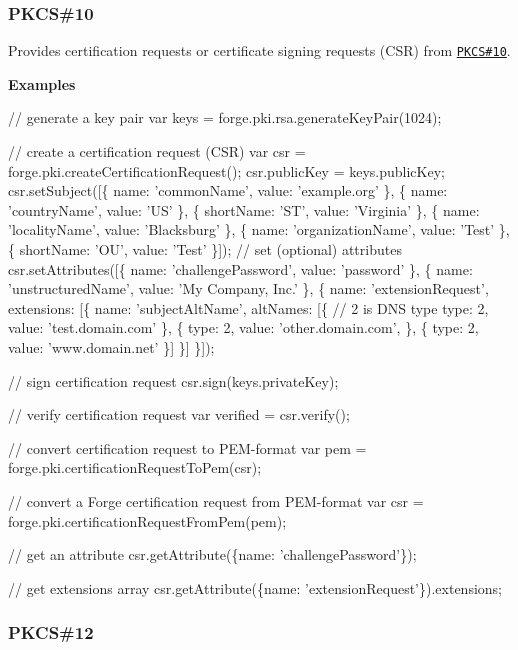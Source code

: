 \label{_pkcs10}%
 \subsubsection*{P\+K\+CS\#10}

Provides certification requests or certificate signing requests (C\+SR) from \href{http://en.wikipedia.org/wiki/Certificate_signing_request}{\tt P\+K\+CS\#10}.

{\bfseries Examples}


\begin{DoxyCode}
// generate a key pair
var keys = forge.pki.rsa.generateKeyPair(1024);

// create a certification request (CSR)
var csr = forge.pki.createCertificationRequest();
csr.publicKey = keys.publicKey;
csr.setSubject([\{
  name: 'commonName',
  value: 'example.org'
\}, \{
  name: 'countryName',
  value: 'US'
\}, \{
  shortName: 'ST',
  value: 'Virginia'
\}, \{
  name: 'localityName',
  value: 'Blacksburg'
\}, \{
  name: 'organizationName',
  value: 'Test'
\}, \{
  shortName: 'OU',
  value: 'Test'
\}]);
// set (optional) attributes
csr.setAttributes([\{
  name: 'challengePassword',
  value: 'password'
\}, \{
  name: 'unstructuredName',
  value: 'My Company, Inc.'
\}, \{
  name: 'extensionRequest',
  extensions: [\{
    name: 'subjectAltName',
    altNames: [\{
      // 2 is DNS type
      type: 2,
      value: 'test.domain.com'
    \}, \{
      type: 2,
      value: 'other.domain.com',
    \}, \{
      type: 2,
      value: 'www.domain.net'
    \}]
  \}]
\}]);

// sign certification request
csr.sign(keys.privateKey);

// verify certification request
var verified = csr.verify();

// convert certification request to PEM-format
var pem = forge.pki.certificationRequestToPem(csr);

// convert a Forge certification request from PEM-format
var csr = forge.pki.certificationRequestFromPem(pem);

// get an attribute
csr.getAttribute(\{name: 'challengePassword'\});

// get extensions array
csr.getAttribute(\{name: 'extensionRequest'\}).extensions;
\end{DoxyCode}


\label{_pkcs12}%
 \subsubsection*{P\+K\+CS\#12}

